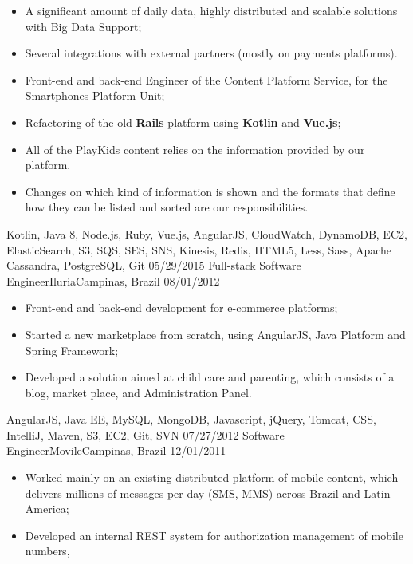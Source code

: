 \begin{experiences}
{\begin{itemize}
      monetization, analytics, users and devices management, notifications, feedback and support,
      media tracking, plugins driven by events, remote configuration, and A/B testing;
      \item A significant amount of daily data, highly distributed and scalable solutions with Big Data Support;
      \item Several integrations with external partners (mostly on payments platforms).
      \item Front-end and back-end Engineer of the Content Platform Service, for the Smartphones Platform Unit;
      \item Refactoring of the old \textbf{Rails} platform using \textbf{Kotlin} and \textbf{Vue.js};
      \item All of the PlayKids content relies on the information provided by our platform.
      \item Changes on which kind of information is shown and the formats that define how they can be listed and sorted are our responsibilities.
    \end{itemize}
  }
  {Kotlin, Java 8, Node.js, Ruby, Vue.js, AngularJS, CloudWatch, DynamoDB, EC2, ElasticSearch, S3, SQS, SES, SNS, Kinesis, Redis, HTML5, Less, Sass, Apache Cassandra, PostgreSQL, Git}
  \emptySeparator
  \experience
    {05/29/2015} {Full-stack Software Engineer}{Iluria}{Campinas, Brazil}
    {08/01/2012}    {
      \begin{itemize}
        \item Front-end and back-end development for e-commerce platforms;
        \item Started a new marketplace from scratch, using AngularJS, Java Platform and Spring Framework;
        \item Developed a solution aimed at child care and parenting, which consists of a blog, market place, and Administration Panel.\\
      \end{itemize}
    }{AngularJS, Java EE, MySQL, MongoDB, Javascript, jQuery, Tomcat, CSS, IntelliJ, Maven, S3, EC2, Git, SVN}
  \emptySeparator
  \experience
    {07/27/2012} {Software Engineer}{Movile}{Campinas, Brazil}
    {12/01/2011}    {
          \begin{itemize}
            \item Worked mainly on an existing distributed platform of mobile content, which delivers millions of
            messages per day (SMS, MMS) across Brazil and Latin America;
            \item Developed an internal REST system for authorization management of mobile numbers,

\end{itemize}}
\end{experiences}
